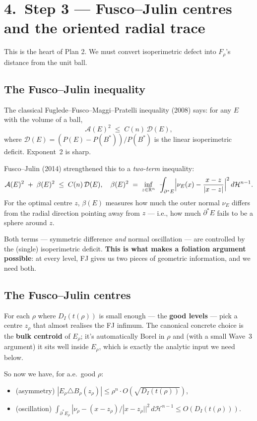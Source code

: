 \documentclass[11pt,a4paper]{article}
\newcommand{\fint}{\,\rlap{\kern.15em\rule[.6ex]{.4em}{.06ex}}\int}
\newcommand{\R}{\mathbb{R}}
\newcommand{\Erho}{E_\rho}
\newcommand{\Bstar}{B^{*}}
\newcommand{\Fr}{\mathcal{A}}
\begin{document}
\section*{4.\ Step 3 --- Fusco--Julin centres and the oriented radial trace}

This is the heart of Plan 2. We must convert isoperimetric defect into $F_\rho$'s distance from the unit ball.

\subsection*{The Fusco--Julin inequality}

The classical Fuglede--Fusco--Maggi--Pratelli inequality (2008) says: for any $E$ with the volume of a ball,
\[
\Fr(E)^2 \;\le\; C(n)\, \mathcal{D}(E),
\]
where $\mathcal{D}(E) = (P(E) - P(\Bstar))/P(\Bstar)$ is the linear isoperimetric deficit. Exponent~2 is sharp.

Fusco--Julin (2014) strengthened this to a \emph{two-term} inequality:
\[
\Fr(E)^2 \;+\; \beta(E)^2 \;\le\; C(n)\, \mathcal{D}(E),
\quad
\beta(E)^2 \;=\; \inf_{z \in \R^n}\, \fint_{\partial^* E} \Bigl|\nu_E(x) - \frac{x-z}{|x-z|}\Bigr|^2\, d\mathcal{H}^{n-1}.
\]
For the optimal centre $z$, $\beta(E)$ measures how much the outer normal $\nu_E$ differs from the radial direction pointing away from $z$ --- i.e., how much $\partial^* E$ fails to be a sphere around $z$.

Both terms --- symmetric difference \emph{and} normal oscillation --- are controlled by the (single) isoperimetric deficit. \textbf{This is what makes a foliation argument possible}: at every level, FJ gives us two pieces of geometric information, and we need both.

\subsection*{The Fusco--Julin centres}

For each $\rho$ where $D_I(t(\rho))$ is small enough --- the \textbf{good levels} --- pick a centre $z_\rho$ that almost realises the FJ infimum. The canonical concrete choice is the \textbf{bulk centroid} of $\Erho$; it's automatically Borel in $\rho$ and (with a small Wave~3 argument) it sits well inside $\Erho$, which is exactly the analytic input we need below.

So now we have, for a.e.\ good $\rho$:
\begin{itemize}[leftmargin=*]
\item (asymmetry) $|\Erho \triangle B_\rho(z_\rho)| \le \rho^n \cdot O(\sqrt{D_I(t(\rho))})$,
\item (oscillation) $\int_{\partial^* \Erho} |\nu_\rho - (x-z_\rho)/|x-z_\rho||^2\, d\mathcal{H}^{n-1} \le O(D_I(t(\rho)))$.
\end{itemize}
\end{document}
